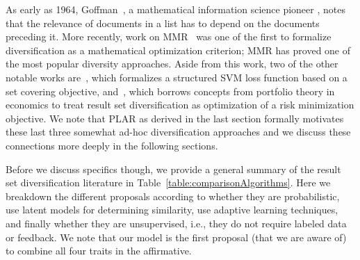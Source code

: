 As early as 1964, Goffman~\cite{goffman64OnRelevanceAsAMeasure}, a
mathematical information science pioneer \cite{harmon08RememberingWG},
notes that the relevance of documents in a list has to depend on the
documents preceding it.  More recently, work on
MMR~\cite{carbonell98MMR} was one of the first to formalize
diversification as a mathematical optimization criterion; MMR has
proved one of the most popular diversity approaches.  Aside from this
work, two of the other notable works are~\cite{yue081224Predicting},
which formalizes a structured SVM loss function based on a set
covering objective, and~\cite{wang09PortfolioTheory}, which borrows
concepts from portfolio theory in economics to treat result set
diversification as optimization of a risk minimization objective.  We
note that PLAR as derived in the last section formally motivates these
last three somewhat ad-hoc diversification approaches and we discuss
these connections more deeply in the following sections.

Before we discuss specifics though, we provide a general summary of
the result set diversification literature in
Table~\ref{table:comparisonAlgorithms}.  Here we breakdown the
different proposals according to whether they are probabilistic, use
latent models for determining similarity, use adaptive learning
techniques, and finally whether they are unsupervised, i.e., they do
not require labeled data or feedback. We note that our model is the first
proposal (that we are aware of) to combine all four traits in the
affirmative. 


